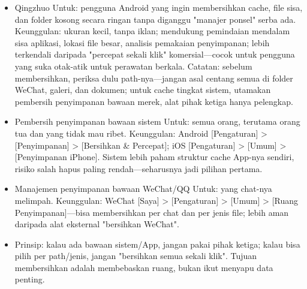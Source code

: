 \begin{itemize}
  \item Qingzhuo Untuk: pengguna Android yang ingin membersihkan cache, file sisa, dan folder kosong secara ringan tanpa diganggu "manajer ponsel" serba ada. Keunggulan: ukuran kecil, tanpa iklan; mendukung pemindaian mendalam sisa aplikasi, lokasi file besar, analisis pemakaian penyimpanan; lebih terkendali daripada "percepat sekali klik" komersial—cocok untuk pengguna yang suka otak-atik untuk perawatan berkala. Catatan: sebelum membersihkan, periksa dulu path-nya—jangan asal centang semua di folder WeChat, galeri, dan dokumen; untuk cache tingkat sistem, utamakan pembersih penyimpanan bawaan merek, alat pihak ketiga hanya pelengkap.
  \item Pembersih penyimpanan bawaan sistem Untuk: semua orang, terutama orang tua dan yang tidak mau ribet. Keunggulan: Android [Pengaturan] > [Penyimpanan] > [Bersihkan \& Percepat]; iOS [Pengaturan] > [Umum] > [Penyimpanan iPhone]. Sistem lebih paham struktur cache App-nya sendiri, risiko salah hapus paling rendah—seharusnya jadi pilihan pertama.
  \item Manajemen penyimpanan bawaan WeChat/QQ Untuk: yang chat-nya melimpah. Keunggulan: WeChat [Saya] > [Pengaturan] > [Umum] > [Ruang Penyimpanan]—bisa membersihkan per chat dan per jenis file; lebih aman daripada alat eksternal "bersihkan WeChat".
  \item Prinsip: kalau ada bawaan sistem/App, jangan pakai pihak ketiga; kalau bisa pilih per path/jenis, jangan "bersihkan semua sekali klik". Tujuan membersihkan adalah membebaskan ruang, bukan ikut menyapu data penting.
\end{itemize}


